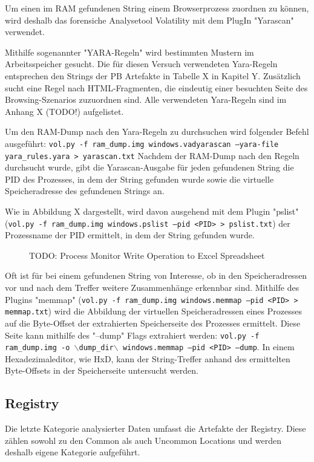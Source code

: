 Um einen im RAM gefundenen String einem Browserprozess zuordnen zu können, wird deshalb das forensiche Analysetool Volatility mit dem PlugIn "Yarascan" verwendet.

Mithilfe sogenannter "YARA-Regeln" wird bestimmten Mustern im Arbeitsspeicher gesucht.
Die für diesen Versuch verwendeten Yara-Regeln entsprechen den Strings der PB Artefakte in Tabelle X in Kapitel Y. Zusätzlich sucht eine Regel nach HTML-Fragmenten, die eindeutig einer besuchten Seite des Browsing-Szenarios zuzuordnen sind. \cite{Said.2011}
Alle verwendeten Yara-Regeln sind im Anhang X (TODO!) aufgelistet.

Um den RAM-Dump nach den Yara-Regeln zu durchsuchen wird folgender Befehl ausgeführt: \texttt{vol.py -f ram\_dump.img windows.vadyarascan --yara-file yara\_rules.yara > yarascan.txt}
Nachdem der RAM-Dump nach den Regeln durchsucht wurde, gibt die Yarascan-Ausgabe für jeden gefundenen String die PID des Prozesses, in dem der String gefunden wurde sowie die virtuelle Speicheradresse des gefundenen Strings an.

Wie in Abbildung X dargestellt, wird davon ausgehend mit dem Plugin "pslist" (\texttt{vol.py -f ram\_dump.img windows.pslist --pid <PID> > pslist.txt}) der Prozessname der PID ermittelt, in dem der String gefunden wurde.
\begin{figure}[h!]
	\centering
	\small
	\centerline{\resizebox{\linewidth}{!}{}}
	\caption{TODO: Process Monitor Write Operation to Excel Spreadsheet}
	\label{fig:jes}
\end{figure}

Oft ist für bei einem gefundenen String von Interesse, ob in den Speicheradressen vor und nach dem Treffer weitere Zusammenhänge erkennbar sind.
Mithilfe des Plugins "memmap" (\texttt{vol.py -f ram\_dump.img windows.memmap --pid <PID> > memmap.txt}) wird die Abbildung der virtuellen Speicheradressen eines Prozesses auf die Byte-Offset der extrahierten Speicherseite des Prozesses ermittelt.
Diese Seite kann mithilfe des "--dump" Flags extrahiert werden: \texttt{vol.py -f ram\_dump.img -o $\backslash$dump\_dir$\backslash$ windows.memmap --pid <PID> --dump}.
In einem Hexadezimaleditor, wie HxD, kann der String-Treffer anhand des ermittelten Byte-Offsets in der Speicherseite untersucht werden.

\subsection{Registry}
\label{subsection:methodik-datenanalyse-registry}
Die letzte Kategorie analysierter Daten umfasst die Artefakte der Registry.
Diese zählen sowohl zu den Common als auch Uncommon Locations und werden deshalb eigene Kategorie aufgeführt.

